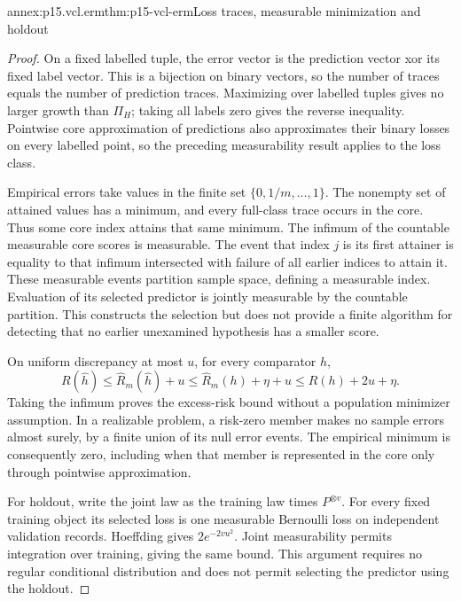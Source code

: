 \begin{annexitem}{annex:p15.vcl.erm}{thm:p15-vcl-erm}{Loss traces, measurable minimization and holdout}
\begin{proof}
On a fixed labelled tuple, the error vector is the prediction vector
xor its fixed label vector. This is a bijection on binary vectors, so
the number of traces equals the number of prediction traces. Maximizing
over labelled tuples gives no larger growth than \(\Pi_H\); taking
all labels zero gives the reverse inequality. Pointwise core approximation
of predictions also approximates their binary losses on every labelled
point, so the preceding measurability result applies to the loss class.

Empirical errors take values in the finite set
\(\{0,1/m,\ldots,1\}\). The nonempty set of attained values has
a minimum, and every full-class trace occurs in the core. Thus some core
index attains that same minimum. The infimum of the countable measurable
core scores is measurable. The event that index \(j\) is its first
attainer is equality to that infimum intersected with failure of all
earlier indices to attain it. These measurable events partition sample
space, defining a measurable index. Evaluation of its selected predictor
is jointly measurable by the countable partition. This constructs the
selection but does not provide a finite algorithm for detecting that no
earlier unexamined hypothesis has a smaller score.

On uniform discrepancy at most \(u\), for every comparator \(h\),
\[
 R(\widehat h)\leq\widehat R_m(\widehat h)+u
 \leq\widehat R_m(h)+\eta+u\leq R(h)+2u+\eta.
\]
Taking the infimum proves the excess-risk bound without a population
minimizer assumption. In a realizable problem, a risk-zero member makes
no sample errors almost surely, by a finite union of its null error events.
The empirical minimum is consequently zero, including when that member
is represented in the core only through pointwise approximation.

For holdout, write the joint law as the training law times \(P^{\otimes v}\).
For every fixed training object its selected loss is one measurable
Bernoulli loss on independent validation records. Hoeffding gives
\(2e^{-2vu^2}\). Joint measurability permits integration over training,
giving the same bound. This argument requires no regular conditional
distribution and does not permit selecting the predictor using the holdout.
\end{proof}
\end{annexitem}

